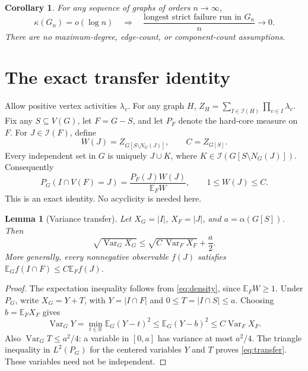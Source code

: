 \documentclass[10pt]{article}
\newtheorem{lemma}[theorem]{Lemma}
\newtheorem{corollary}[theorem]{Corollary}
\newcommand{\Var}{\operatorname{Var}}
\newcommand{\IS}{\mathcal I}
\begin{document}
\begin{corollary}\label{cor:asym}
For any sequence of graphs of orders \(n\to\infty\),
\[
 \kappa(G_n)=o(\log n)
 \quad\Longrightarrow\quad
 \frac{\text{longest strict failure run in }G_n}{n}\longrightarrow0.
\]
There are no maximum-degree, edge-count, or component-count assumptions.
\end{corollary}

\section{The exact transfer identity}
Allow positive vertex activities \(\lambda_v\). For any graph \(H\),
\(Z_H=\sum_{I\in\IS(H)}\prod_{v\in I}\lambda_v\).
Fix any \(S\subseteq V(G)\), let \(F=G-S\), and let \(P_F\) denote the
hard-core measure on \(F\). For \(J\in\IS(F)\), define
\[
 W(J)=Z_{G[S\setminus N_G(J)]},\qquad C=Z_{G[S]}.
\]
Every independent set in \(G\) is uniquely \(J\cup K\), where
\(K\in\IS(G[S\setminus N_G(J)])\). Consequently
\begin{equation}\label{eq:density}
 P_G(I\cap V(F)=J)=\frac{P_F(J)W(J)}{\mathbb E_F W},
 \qquad 1\le W(J)\le C.
\end{equation}
This is an exact identity. No acyclicity is needed here.

\begin{lemma}[Variance transfer]\label{lem:transfer}
Let \(X_G=|I|\), \(X_F=|J|\), and \(a=\alpha(G[S])\). Then
\begin{equation}\label{eq:transfer}
 \sqrt{\Var_G X_G}\le
       \sqrt{C\,\Var_F X_F}+\frac a2.
\end{equation}
More generally, every nonnegative observable \(f(J)\) satisfies
\(\mathbb E_G f(I\cap F)\le C\mathbb E_F f(J)\).
\end{lemma}
\begin{proof}
The expectation inequality follows from \eqref{eq:density}, since
\(\mathbb E_F W\ge1\). Under \(P_G\), write \(X_G=Y+T\), with
\(Y=|I\cap F|\) and \(0\le T=|I\cap S|\le a\). Choosing
\(b=\mathbb E_F X_F\) gives
\[
 \Var_GY=\min_{t\in\mathbb R}\mathbb E_G(Y-t)^2
 \le\mathbb E_G(Y-b)^2\le C\Var_F X_F.
\]
Also \(\Var_GT\le a^2/4\): a variable in \([0,a]\) has variance at most
\(a^2/4\). The triangle inequality in \(L^2(P_G)\) for the centered
variables \(Y\) and \(T\) proves \eqref{eq:transfer}. These variables
need not be independent.
\end{proof}
\end{document}
